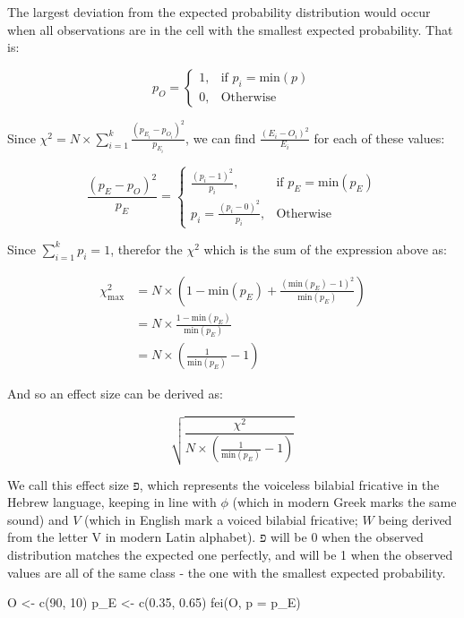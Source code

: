 \documentclass[
]{article}
\newenvironment{Shaded}{\begin{snugshade}}{\end{snugshade}}
\newcommand{\AttributeTok}[1]{\textcolor[rgb]{0.77,0.63,0.00}{#1}}
\newcommand{\DecValTok}[1]{\textcolor[rgb]{0.00,0.00,0.81}{#1}}
\newcommand{\FloatTok}[1]{\textcolor[rgb]{0.00,0.00,0.81}{#1}}
\newcommand{\FunctionTok}[1]{\textcolor[rgb]{0.00,0.00,0.00}{#1}}
\newcommand{\NormalTok}[1]{#1}
\newcommand{\OtherTok}[1]{\textcolor[rgb]{0.56,0.35,0.01}{#1}}
\begin{document}
The largest deviation from the expected probability distribution would
occur when all observations are in the cell with the smallest expected
probability. That is:

\[
p_{O} = 
\begin{cases}
1, & \text{if } p_i = \text{min}(p) \\
0, & \text{Otherwise}
\end{cases}
\]

Since
\(\chi^2 = N \times\sum_{i=1}^{k}{\frac{(p_{E_i}-p_{O_i})^2}{p_{E_i}}}\),
we can find \(\frac{(E_i-O_i)^2}{E_i}\) for each of these values:

\[
\frac{(p_{E}-p_{O})^2}{p_{E}} = 
\begin{cases}
\frac{(p_i-1)^2}{p_i}, & \text{if } p_{E} = \text{min}(p_{E}) \\
p_i = \frac{(p_i-0)^2}{p_i}, & \text{Otherwise}
\end{cases}
\]

Since \(\sum_{i=1}^{k}{p_i}=1\), therefor the \(\chi^2\) which is the
sum of the expression above as:

\[
\begin{split}
\chi^2_\text{max} & = N \times (1 - \text{min}(p_E) + \frac{(\text{min}(p_E)-1)^2}{\text{min}(p_E)}) \\
 & = N \times \frac{1-\text{min}(p_E)}{\text{min}(p_E)} \\
 & = N \times (\frac{1}{\text{min}(p_E)} - 1)
\end{split}
\]

And so an effect size can be derived as:

\[
\sqrt{\frac{\chi^2}{N \times (\frac{1}{\text{min}(p_E)} - 1)}}
\]

We call this effect size \(פ\), which represents the voiceless bilabial
fricative in the Hebrew language, keeping in line with \(\phi\) (which
in modern Greek marks the same sound) and \(V\) (which in English mark a
voiced bilabial fricative; \(W\) being derived from the letter V in
modern Latin alphabet). \(פ\) will be 0 when the observed distribution
matches the expected one perfectly, and will be 1 when the observed
values are all of the same class - the one with the smallest expected
probability.

\begin{Shaded}
\begin{Highlighting}[]
\NormalTok{O }\OtherTok{\textless{}{-}} \FunctionTok{c}\NormalTok{(}\DecValTok{90}\NormalTok{, }\DecValTok{10}\NormalTok{)}
\NormalTok{p\_E }\OtherTok{\textless{}{-}} \FunctionTok{c}\NormalTok{(}\FloatTok{0.35}\NormalTok{, }\FloatTok{0.65}\NormalTok{)}
\FunctionTok{fei}\NormalTok{(O, }\AttributeTok{p =}\NormalTok{ p\_E)}
\end{Highlighting}
\end{Shaded}
\end{document}
